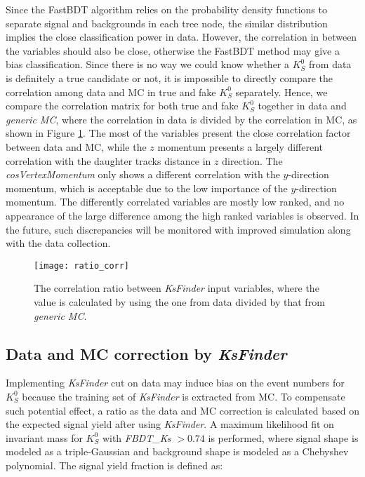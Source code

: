 Since the FastBDT algorithm relies on the probability density functions to separate signal and backgrounds in each tree node, the similar distribution implies the close classification power in data. However, the correlation in between the variables should also be close, otherwise the FastBDT method may give a bias classification. Since there is no way we could know whether a $K_S^0$ from data is definitely a true candidate or not, it is impossible to directly compare the correlation among data and MC in true and fake $K_S^0$ separately. Hence, we compare the correlation matrix for both true and fake $K_S^0$ together in data and \textit{generic MC}, where the correlation in data is divided by the correlation in MC, as shown in Figure \ref{fig:ratio_corr}. The most of the variables present the close correlation factor between data and MC, while the $z$ momentum presents a largely different correlation with the daughter tracks distance in $z$ direction. The \textit{cosVertexMomentum} only shows a different correlation with the $y$-direction momentum, which is acceptable due to the low importance of the $y$-direction momentum.  The differently correlated variables are mostly low ranked, and no appearance of the large difference among the high ranked variables is observed. In the future, such discrepancies will be monitored with improved simulation along with the data collection.
\begin{figure}[htpb]
		\centering 
		\texttt{[image: ratio\_corr]}
	\caption{The correlation ratio between \textit{KsFinder} input variables, where the value is calculated by using the one from data divided by that from \textit{generic MC}.}
	\label{fig:ratio_corr}
\end{figure}


\subsection{Data and MC correction by \textit{KsFinder}}
Implementing \textit{KsFinder} cut on data may induce bias on the event numbers for $K_S^0$ because the training set of \textit{KsFinder} is extracted from MC. To compensate such potential effect, a ratio as the data and MC correction is calculated based on the expected signal yield after using \textit{KsFinder}. A maximum likelihood fit on invariant mass for $K_S^0$ with \textit{FBDT\_Ks} $>0.74$ is performed, where signal shape is modeled as a triple-Gaussian and background shape is modeled as a Chebyshev polynomial. The signal yield fraction is defined as:

